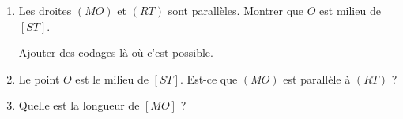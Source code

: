 
\begin{exercice}\label{exosmath-1001}

    \begin{enumerate}
        \item
        Les droites \( (MO)\) et \( (RT)\) sont parallèles. Montrer que \( O\) est milieu de \( [ST]\).
        \begin{center}
            
        \end{center}
        Ajouter des codages là où c'est possible.
    \item
        Le point \( O\) est le milieu de \( [ST]\). Est-ce que \( (MO)\) est parallèle à \( (RT)\) ?
        \begin{center}
            
        \end{center}
    \item
        Quelle est la longueur de \( [MO]\) ?
        \begin{center}
            
        \end{center}
    \end{enumerate}

\end{exercice}
